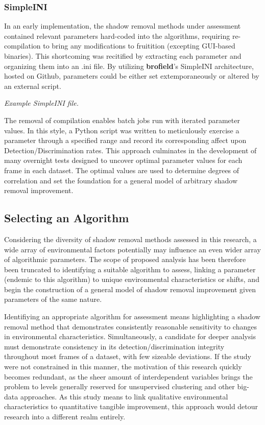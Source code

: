\documentclass[12pt]{report}
\begin{document}
\subsubsection{SimpleINI}
In an early implementation, the shadow removal methods under assessment contained relevant parameters hard-coded into the algorithms, requiring re-compilation to bring any modifications to fruitition (excepting GUI-based binaries). This shortcoming was recitified by extracting each parameter and organizing them into an .ini file. By utilizing \textbf{brofield}'s SimpleINI architecture, hosted on Github, parameters could be either set extemporaneously or altered by an external script. 

\textit{Example SimpleINI file.}

The removal of compilation enables batch jobs run with iterated parameter values. In this style, a Python script was written to meticulously exercise a parameter through a specified range and record its corresponding affect upon Detection/Discrimination rates. This approach culminates in the development of many overnight tests designed to uncover optimal parameter values for each frame in each dataset. The optimal values are used to determine degrees of correlation and set the foundation for a general model of arbitrary shadow removal improvement.

\subsection{Selecting an Algorithm}

Considering the diversity of shadow removal methods assessed in this research, a wide array of environmental factors potentially may influence an even wider array of algorithmic parameters. The scope of proposed analysis has been therefore been truncated to identifying a suitable algorithm to assess, linking a parameter (endemic to this algorithm) to unique environmental characteristics or shifts, and begin the construction of a general model of shadow removal improvement given parameters of the same nature.

Identifiying an appropriate algorithm for assessment means highlighting a shadow removal method that demonstrates consistently reasonable sensitivity to changes in environmental characteristics. Simultaneously, a candidate for deeper analysis must demonstrate consistency in its detection/discrimination integrity throughout most frames of a dataset, with few sizeable deviations. If the study were not constrained in this manner, the motivation of this research quickly becomes redundant, as the sheer amount of interdependent variables brings the problem to levels generally reserved for unsupervised clustering and other big-data approaches. As this study means to link qualitative environmental characteristics to quantitative tangible improvement, this approach would detour research into a different realm entirely.
\end{document}
